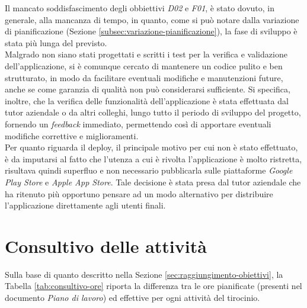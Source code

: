 \noindent Il mancato soddisfascimento degli obbiettivi \emph{D02} e \emph{F01}, è stato dovuto, in generale, alla mancanza di tempo, in quanto, come si può notare dalla variazione di pianificazione (Sezione \ref{subsec:variazione-pianificazione}), la fase di sviluppo è stata più lunga del previsto.\\
Malgrado non siano stati progettati e scritti i test per la verifica e validazione dell'applicazione, si è comunque cercato di mantenere un codice pulito e ben strutturato, in modo da facilitare eventuali modifiche e manutenzioni future, anche se come garanzia di qualità non può considerarsi sufficiente.
Si specifica, inoltre, che la verifica delle funzionalità dell'applicazione è stata effettuata dal tutor aziendale o da altri colleghi, lungo tutto il periodo di sviluppo del progetto, fornendo un \emph{feedback} immediato, permettendo così di apportare eventuali modifiche correttive e miglioramenti.\\
Per quanto riguarda il \gls{deploy}\glsoccur, il principale motivo per cui non è stato effettuato, è da imputarsi al fatto che l'utenza a cui è rivolta l'applicazione è molto ristretta, risultava quindi superfluo e non necessario pubblicarla sulle piattaforme \emph{Google Play Store} e \emph{Apple App Store}. Tale decisione è stata presa dal tutor aziendale che ha ritenuto più opportuno pensare ad un modo alternativo per distribuire l'applicazione direttamente agli utenti finali.

\section{Consultivo delle attività}
\label{sec:consultivo-attivita}

Sulla base di quanto descritto nella Sezione \ref{sec:raggiungimento-obiettivi}, la Tabella \ref{tab:consultivo-ore} riporta la differenza tra le ore pianificate (presenti nel documento \emph{Piano di lavoro}) ed effettive per ogni attività del tirocinio.

